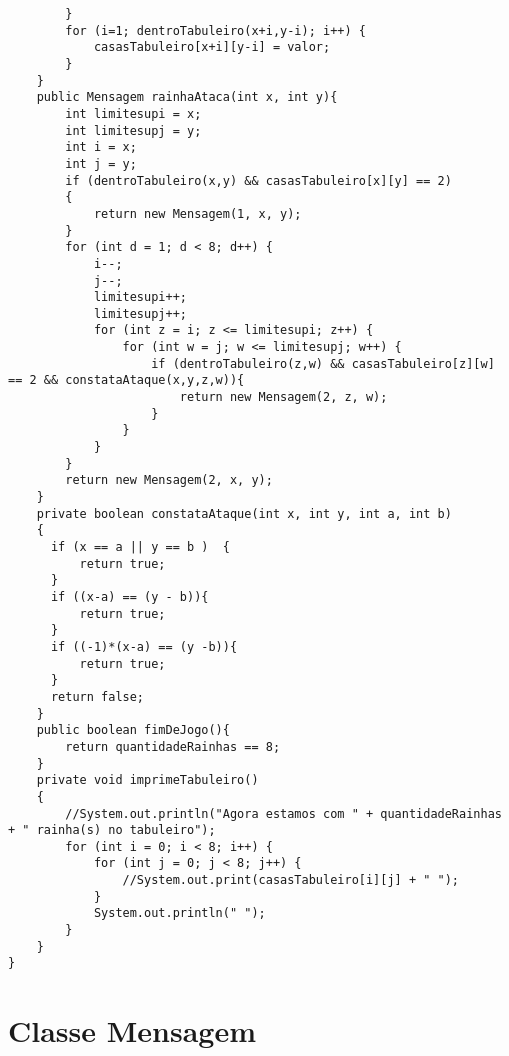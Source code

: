 \begin{lstlisting}
        }
        for (i=1; dentroTabuleiro(x+i,y-i); i++) {
            casasTabuleiro[x+i][y-i] = valor;
        }
    }
    public Mensagem rainhaAtaca(int x, int y){
        int limitesupi = x;
        int limitesupj = y;
        int i = x; 
        int j = y; 
        if (dentroTabuleiro(x,y) && casasTabuleiro[x][y] == 2)
        {
            return new Mensagem(1, x, y);
        }
        for (int d = 1; d < 8; d++) {
            i--;
            j--;
            limitesupi++;
            limitesupj++;
            for (int z = i; z <= limitesupi; z++) {
                for (int w = j; w <= limitesupj; w++) {
                    if (dentroTabuleiro(z,w) && casasTabuleiro[z][w] == 2 && constataAtaque(x,y,z,w)){
                        return new Mensagem(2, z, w);
                    }
                }
            }
        }
        return new Mensagem(2, x, y);
    }
    private boolean constataAtaque(int x, int y, int a, int b)
    { 
      if (x == a || y == b )  {
          return true;
      }
      if ((x-a) == (y - b)){ 
          return true;
      }
      if ((-1)*(x-a) == (y -b)){ 
          return true; 
      }
      return false;
    }
    public boolean fimDeJogo(){
        return quantidadeRainhas == 8;
    }
    private void imprimeTabuleiro()
    {
        //System.out.println("Agora estamos com " + quantidadeRainhas + " rainha(s) no tabuleiro");
        for (int i = 0; i < 8; i++) {
            for (int j = 0; j < 8; j++) {
                //System.out.print(casasTabuleiro[i][j] + " ");
            }
            System.out.println(" ");
        }
    }   
}

\end{lstlisting}
\newpage
\section{Classe Mensagem}

